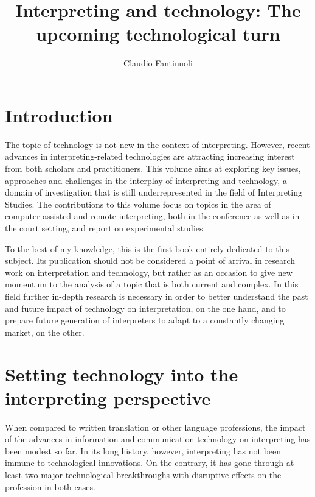\documentclass[output=paper]{langsci/langscibook}
\title{Interpreting and technology: The upcoming technological turn}
\author{Claudio Fantinuoli\affiliation{University of Mainz}}
\begin{document}

 

 
\section{Introduction} 
 
The topic of technology is not new in the context of interpreting. However, recent advances in interpreting-related technologies are attracting increasing interest from both scholars and practitioners. This volume aims at exploring key issues, approaches and challenges in the interplay of interpreting and technology, a domain of investigation that is still underrepresented in the field of Interpreting Studies. The contributions to this volume focus on topics in the area of computer-assisted and remote interpreting, both in the conference as well as in the court setting, and report on experimental studies.
 
To the best of my knowledge, this is the first book entirely dedicated to this subject. Its publication should not be considered a point of arrival in research work on interpretation and technology, but rather as an occasion to give new momentum to the analysis of a topic that is both current and complex. In this field further in-depth research is necessary in order to better understand the past and future impact of technology on interpretation, on the one hand, and to prepare future generation of interpreters to adapt to a constantly changing market, on the other.
 
\section{Setting technology into the interpreting perspective} 
When compared to written translation or other language professions, the impact of the advances in information and communication technology on interpreting has been modest so far. In its long history, however, interpreting has not been immune to technological innovations. On the contrary, it has gone through at least two major technological breakthroughs with disruptive effects on the profession in both cases. 
 
\end{document}
